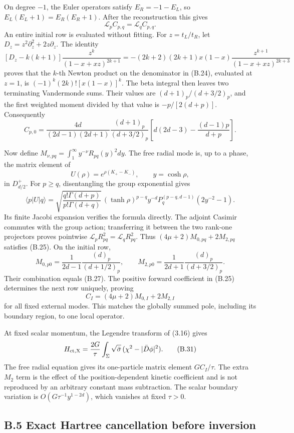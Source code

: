 \documentclass[a4paper,11pt]{article}
\numberwithin{equation}{section}
\begin{document}
On degree \(-1\), the Euler operators satisfy \(E_R=-1-E_L\), so \(E_L(E_L+1)=E_R(E_R+1)\). After the reconstruction this gives \[
\mathscr L_pC_{p,q}=\mathscr L_qC_{p,q}.
\tag{B.25}
\] An entire initial row is evaluated without fitting. For \(z=t_L/t_R\), let \(D_z=z^2\partial_z^2+2z\partial_z\). The identity \[
[D_z-k(k+1)]
\frac{z^k}{(1-x+xz)^{2k+1}}
=-(2k+2)(2k+1)x(1-x)
\frac{z^{k+1}}{(1-x+xz)^{2k+3}}
\tag{B.26}
\] proves that the \(k\)-th Newton product on the denominator in (B.24), evaluated at \(z=1\), is \((-1)^k(2k)![x(1-x)]^k\). The beta integral then leaves two terminating Vandermonde sums. Their values are \((d+1)_p/(d+3/2)_p\), and the first weighted moment divided by that value is \(-p/[2(d+p)]\). Consequently \[
C_{p,0}=
\frac{4d}{(2d-1)(2d+1)}
\frac{(d+1)_p}{(d+3/2)_p}
\left[d(2d-3)-\frac{(d-1)p}{d+p}\right].
\tag{B.27}
\]

Now define \(M_{\nu,pq}=\int_1^\infty y^{-\nu}R_{pq}(y)^2dy\). The free radial mode is, up to a phase, the matrix element of \[
U(\rho)=e^{\rho(K_+-K_-)},\qquad y=\cosh\rho ,
\] in \(D^+_{d/2}\). For \(p\ge q\), disentangling the group exponential gives \[
\langle p|U|q\rangle
=\sqrt{\frac{q!\Gamma(d+p)}{p!\Gamma(d+q)}}\,
(\tanh\rho)^{p-q}y^{-d}
P_q^{(p-q,d-1)}(2y^{-2}-1).
\tag{B.28}
\] Its finite Jacobi expansion verifies the formula directly. The adjoint Casimir commutes with the group action; transferring it between the two rank-one projectors proves pointwise \(\mathscr L_pR_{pq}^2=\mathscr L_qR_{pq}^2\). Thus \((4\mu+2)M_{0,pq}+2M_{2,pq}\) satisfies (B.25). On the initial row, \[
M_{0,p0}=\frac1{2d-1}\frac{(d)_p}{(d+1/2)_p},
\qquad
M_{2,p0}=\frac1{2d+1}\frac{(d)_p}{(d+3/2)_p}.
\tag{B.29}
\] Their combination equals (B.27). The positive forward coefficient in (B.25) determines the next row uniquely, proving \[
C_I=(4\mu+2)M_{0,I}+2M_{2,I}
\tag{B.30}
\] for all fixed external modes. This matches the globally summed pole, including its boundary region, to one local operator.

At fixed scalar momentum, the Legendre transform of (3.16) gives \[
H_{\rm ct,X}=\frac{2G}{\tau}
\int_\Sigma\sqrt{\bar\sigma}\,
(\chi^2-|\bar D\phi|^2).
\tag{B.31}
\] The free radial equation gives its one-particle matrix element \(GC_I/\tau\). The extra \(M_2\) term is the effect of the position-dependent kinetic coefficient and is not reproduced by an arbitrary constant mass subtraction. The scalar boundary variation is \(O(G\tau^{-1}y^{1-2d})\), which vanishes at fixed \(\tau>0\).

\hypertarget{b.5-exact-hartree-cancellation-before-inversion}{%
\subsection{B.5 Exact Hartree cancellation before inversion}\label{b.5-exact-hartree-cancellation-before-inversion}}
\end{document}
